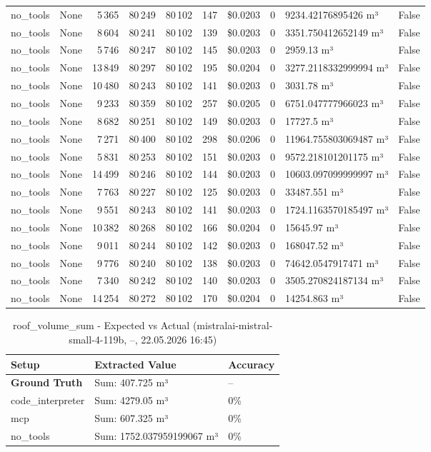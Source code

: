 \documentclass[a4paper,11pt]{article}
\begin{document}
\begin{table}[H]
{\begin{tabular}{l r r r r r r r l r}
no\_tools & None & 5\,365 & 80\,249 & 80\,102 & 147 & \$0.0203 & 0 & 9234.42176895426 m³ & False \\
no\_tools & None & 8\,604 & 80\,241 & 80\,102 & 139 & \$0.0203 & 0 & 3351.750412652149 m³ & False \\
no\_tools & None & 5\,746 & 80\,247 & 80\,102 & 145 & \$0.0203 & 0 & 2959.13 m³ & False \\
no\_tools & None & 13\,849 & 80\,297 & 80\,102 & 195 & \$0.0204 & 0 & 3277.2118332999994 m³ & False \\
no\_tools & None & 10\,480 & 80\,243 & 80\,102 & 141 & \$0.0203 & 0 & 3031.78 m³ & False \\
no\_tools & None & 9\,233 & 80\,359 & 80\,102 & 257 & \$0.0205 & 0 & 6751.047777966023 m³ & False \\
no\_tools & None & 8\,682 & 80\,251 & 80\,102 & 149 & \$0.0203 & 0 & 17727.5 m³ & False \\
no\_tools & None & 7\,271 & 80\,400 & 80\,102 & 298 & \$0.0206 & 0 & 11964.755803069487 m³ & False \\
no\_tools & None & 5\,831 & 80\,253 & 80\,102 & 151 & \$0.0203 & 0 & 9572.218101201175 m³ & False \\
no\_tools & None & 14\,499 & 80\,246 & 80\,102 & 144 & \$0.0203 & 0 & 10603.097099999997 m³ & False \\
no\_tools & None & 7\,763 & 80\,227 & 80\,102 & 125 & \$0.0203 & 0 & 33487.551 m³ & False \\
no\_tools & None & 9\,551 & 80\,243 & 80\,102 & 141 & \$0.0203 & 0 & 1724.1163570185497 m³ & False \\
no\_tools & None & 10\,382 & 80\,268 & 80\,102 & 166 & \$0.0204 & 0 & 15645.97 m³ & False \\
no\_tools & None & 9\,011 & 80\,244 & 80\,102 & 142 & \$0.0203 & 0 & 168047.52 m³ & False \\
no\_tools & None & 9\,776 & 80\,240 & 80\,102 & 138 & \$0.0203 & 0 & 74642.0547917471 m³ & False \\
no\_tools & None & 7\,340 & 80\,242 & 80\,102 & 140 & \$0.0203 & 0 & 3505.270824187134 m³ & False \\
no\_tools & None & 14\,254 & 80\,272 & 80\,102 & 170 & \$0.0204 & 0 & 14254.863 m³ & False \\
\bottomrule
\end{tabular}}
\end{table}

\begin{table}[H]
\centering
\scriptsize
\caption{roof\_volume\_sum - Expected vs Actual (mistralai-mistral-small-4-119b, --, 22.05.2026 16:45)}
\begin{tabular}{l l l}
\toprule
Setup & Extracted Value & Accuracy \\
\midrule
\textbf{Ground Truth} & Sum: 407.725 m³ & -- \\
\midrule
code\_interpreter & Sum: 4279.05 m³ & 0\% \\
mcp & Sum: 607.325 m³ & 0\% \\
no\_tools & Sum: 1752.037959199067 m³ & 0\% \\
\bottomrule
\end{tabular}
\end{table}
\end{document}
